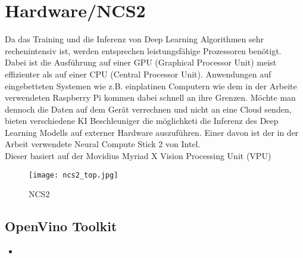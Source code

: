 \section{Hardware/NCS2}\label{sec:hardware}

Da das Training und die Inferenz von Deep Learning Algorithmen
 sehr rechenintensiv ist, werden entsprechen leistungsfähige 
Prozessoren benötigt. Dabei ist die Ausführung auf einer GPU 
(Graphical Processor Unit) meist effizienter als auf einer 
CPU (Central Processor Unit). Anwendungen auf eingebetteten Systemen
wie z.B. einplatinen Computern wie dem in der Arbeite verwendeten
Raspberry Pi kommen dabei schnell an ihre Grenzen.
Möchte man dennoch die Daten auf dem Gerät verrechnen und 
nicht an eine Cloud senden, bieten verschiedene KI Beschleuniger 
die möglichketi die Inferenz des Deep Learning Modells 
auf externer Hardware auszuführen. Einer davon ist der in der 
Arbeit verwendete Neural Compute Stick 2 von Intel.
\\
Dieser basiert auf der Movidius Myriad X Vision Processing Unit (VPU)
\cite{haussermannFunktionUndEffizienz}

\begin{figure}[htb]
    \centering
    \label{fig:ncs2}
    \texttt{[image: ncs2\_top.jpg]}
    \caption{NCS2}
\end{figure}

\subsection{OpenVino Toolkit}


\begin{itemize}
    \item 
\end{itemize}
